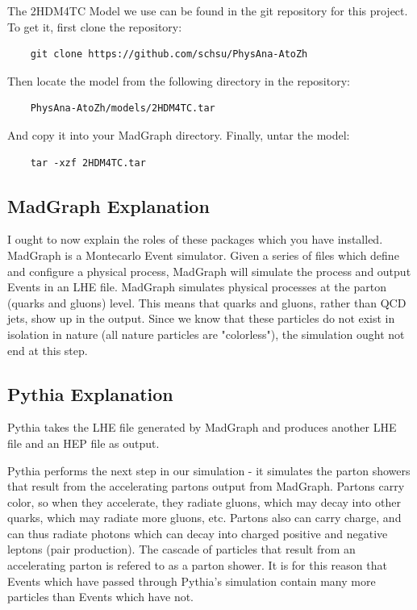 \documentclass{article}
\begin{document}
The 2HDM4TC Model we use can be found in the git repository for this project.
To get it, first clone the repository:

\begin{verbatim}
	git clone https://github.com/schsu/PhysAna-AtoZh
\end{verbatim}

Then locate the model from the following directory in the repository:

\begin{verbatim}
	PhysAna-AtoZh/models/2HDM4TC.tar
\end{verbatim}

And copy it into your MadGraph directory. Finally, untar the model:

\begin{verbatim}
	tar -xzf 2HDM4TC.tar
\end{verbatim}

\subsection{MadGraph Explanation}

I ought to now explain the roles of these packages which you have installed. MadGraph is a Montecarlo Event simulator.
Given a series of files which define and configure a physical process, MadGraph will simulate the process and output
Events in an LHE file. MadGraph simulates physical processes at the parton (quarks and gluons) level. This means that quarks and gluons,
rather than QCD jets, show up in the output. Since we know that these particles do not exist in isolation in nature
(all nature particles are "colorless"), the simulation ought not end at this step.

\subsection{Pythia Explanation}

Pythia takes the LHE file generated by MadGraph and produces another LHE file and an HEP file as output.

\bigskip

Pythia performs the next step in our simulation - it simulates the parton showers that result from the accelerating
partons output from MadGraph. Partons carry color, so when they accelerate, they radiate gluons, which may decay
into other quarks, which may radiate more gluons, etc. Partons also can carry charge, and can thus radiate photons
which can decay into charged positive and negative leptons (pair production). The cascade of particles that
result from an accelerating parton is refered to as a parton shower. It is for this reason that Events which have
passed through Pythia's simulation contain many more particles than Events which have not.
\end{document}
